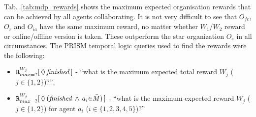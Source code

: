 \documentclass{llncs}
\begin{document}
Tab.~\ref{tab:mdp_rewards} shows the maximum expected organisation rewards that can be achieved by all agents collaborating. It is not very difficult to see that $O_{\mathit{fc}}$, $O_r$ and $O_{ia}$ have the same maximum reward, no matter whether $W_1$/$W_2$ reward or online/offline version is taken. These outperform the star organization $O_s$ in all circumstances. The PRISM temporal logic queries used to find the rewards were the following:
\begin{itemize}
 \item ${\tt R}_{max=?}^{W_{j}}[\,\Diamond\,\mathit{finished}\,]$ -
``what is the maximum expected total reward $W_j$ ($j\in\{1,2\}$)?'',
 \item ${\tt R}_{max=?}^{W_{j}}[\,\Diamond\,(\mathit{finished} \,\wedge\, a_i {\in} \bar{M}) \,]$ -
``what is the maximum expected reward $W_j$ ($j\in\{1,2\}$) for agent $a_i$ ($i\in\{1,2,3,4,5\}$)?''
\end{itemize}

\vspace{-30pt}
\begin{table}[H]
\centering
{}
\vspace{-2pt}
\caption{Maximal rewards that can be achieved by agent organisations from Fig.~\ref{fig:network_configurations} using Alg.~\ref{alg:join_team_nondet}'s offline and online versions defined in Alg.~\ref{alg:main_process}.}
\label{tab:mdp_rewards}
\end{table}
\vspace{-32pt}
\end{document}

